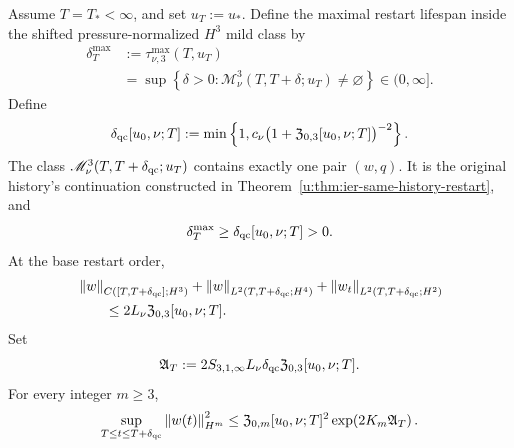 \begin{theorem}
\label{u:thm:qc-restart}
Assume \(T=T_*<\infty\), and set \(u_T:=u_*\).
Define the maximal restart lifespan inside the shifted pressure-normalized
\(H^3\) mild class by
\begin{equation}
 \begin{aligned}
 \delta_T^{\max}
 &:=\tau_{\nu,3}^{\max}(T,u_T)\\
 &=\sup\left\{\delta>0:
 \mathscr M_\nu^3(T,T+\delta;u_T)\ne\varnothing\right\}
 \in(0,\infty].
 \end{aligned}
 \label{u:eq:qc-maximal-restart-lifespan-definition}
\end{equation}
Define
\begin{equation}
 \delta_{\rm qc}[u_0,\nu;T]
 :=\min\left\{
 1,
 c_\nu\bigl(1+\mathfrak Z_{0,3}[u_0,\nu;T]\bigr)^{-2}
 \right\}.
 \label{u:eq:qc-restart-lifespan}
\end{equation}
The class \(\mathscr M_\nu^3(T,T+\delta_{\rm qc};u_T)\) contains exactly one
pair \((w,q)\).  It is the original history's continuation constructed in
Theorem~\ref{u:thm:ier-same-history-restart}, and
\begin{equation}
 \delta_T^{\max}\ge\delta_{\rm qc}[u_0,\nu;T]>0.
 \label{u:eq:qc-restart-lower-bound}
\end{equation}
At the base restart order,
\begin{align}
 &\left\lVert w\right\rVert_{C([T,T+\delta_{\rm qc}];H^3)}
 +\left\lVert w\right\rVert_{L^2(T,T+\delta_{\rm qc};H^4)}
 +\left\lVert w_t\right\rVert_{L^2(T,T+\delta_{\rm qc};H^2)}
 \notag\\
 &\qquad\le2L_\nu\mathfrak Z_{0,3}[u_0,\nu;T].
 \label{u:eq:qc-restart-base-size}
\end{align}
Set
\begin{equation}
 \mathfrak A_T
 :=2S_{3,1,\infty}L_\nu\delta_{\rm qc}
 \mathfrak Z_{0,3}[u_0,\nu;T].
 \label{u:eq:qc-restart-action}
\end{equation}
For every integer \(m\ge3\),
\begin{equation}
 \sup_{T\le t\le T+\delta_{\rm qc}}\left\lVert w(t)\right\rVert_{H^m}^2
 \le\mathfrak Z_{0,m}[u_0,\nu;T]^2
 \exp\!\left(2K_m\mathfrak A_T\right).
 \label{u:eq:qc-restart-persistence-size}
\end{equation}
\end{theorem}

